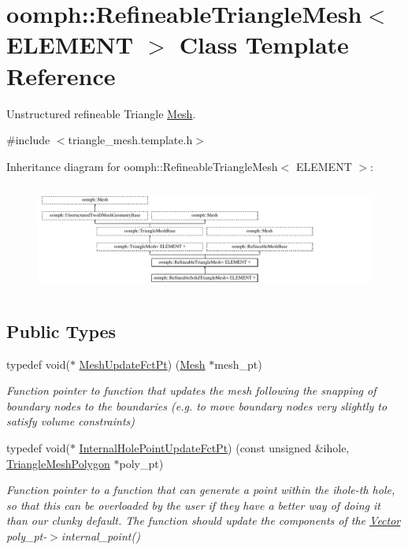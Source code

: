 \hypertarget{classoomph_1_1RefineableTriangleMesh}{}\section{oomph\+:\+:Refineable\+Triangle\+Mesh$<$ E\+L\+E\+M\+E\+NT $>$ Class Template Reference}
\label{classoomph_1_1RefineableTriangleMesh}


Unstructured refineable Triangle \hyperlink{classoomph_1_1Mesh}{Mesh}.  




{\ttfamily \#include $<$triangle\+\_\+mesh.\+template.\+h$>$}

Inheritance diagram for oomph\+:\+:Refineable\+Triangle\+Mesh$<$ E\+L\+E\+M\+E\+NT $>$\+:\begin{figure}[H]
\begin{center}
\leavevmode
\includegraphics[height=3.612903cm]{classoomph_1_1RefineableTriangleMesh}
\end{center}
\end{figure}
\subsection*{Public Types}
\begin{DoxyCompactItemize}
\item 
typedef void($\ast$ \hyperlink{classoomph_1_1RefineableTriangleMesh_aa78ffa56b66a1371aec25e25f7aaff9e}{Mesh\+Update\+Fct\+Pt}) (\hyperlink{classoomph_1_1Mesh}{Mesh} $\ast$mesh\+\_\+pt)
\begin{DoxyCompactList}\small\item\em Function pointer to function that updates the mesh following the snapping of boundary nodes to the boundaries (e.\+g. to move boundary nodes very slightly to satisfy volume constraints) \end{DoxyCompactList}\item 
typedef void($\ast$ \hyperlink{classoomph_1_1RefineableTriangleMesh_aa6831f42aa1941f4ae0b9186d01f9d7c}{Internal\+Hole\+Point\+Update\+Fct\+Pt}) (const unsigned \&ihole, \hyperlink{classoomph_1_1TriangleMeshPolygon}{Triangle\+Mesh\+Polygon} $\ast$poly\+\_\+pt)
\begin{DoxyCompactList}\small\item\em Function pointer to a function that can generate a point within the ihole-\/th hole, so that this can be overloaded by the user if they have a better way of doing it than our clunky default. The function should update the components of the \hyperlink{classoomph_1_1Vector}{Vector} poly\+\_\+pt-\/$>$internal\+\_\+point() \end{DoxyCompactList}\end{DoxyCompactItemize}
